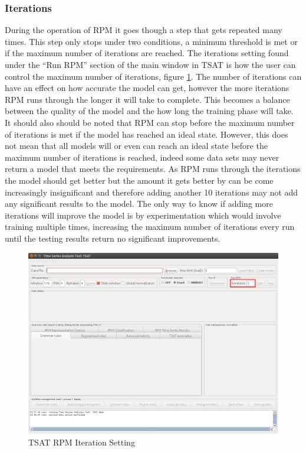 \documentclass[letterpaper, 12pt]{article}
\begin{document}
\newpage
\subsubsection{Iterations}
\label{iterations}
During the operation of RPM it goes though a step that gets repeated many times. This step only stops under two conditions, a minimum threshold is met or if the maximum number of iterations are reached. The iterations setting found under the ``Run RPM'' section of the main window in TSAT is how the user can control the maximum number of iterations, figure \ref{fig:TSAT-iteration-setting}. The number of iterations can have an effect on how accurate the model can get, however the more iterations RPM runs through the longer it will take to complete. This becomes a balance between the quality of the model and the how long the training phase will take. It should also should be noted that RPM can stop before the maximum number of iterations is met if the model has reached an ideal state. However, this does not mean that all models will or even can reach an ideal state before the maximum number of iterations is reached, indeed some data sets may never return a model that meets the requirements. As RPM runs through the iterations the model should get better but the amount it gets better by can be come increasingly insignificant and therefore adding another 10 iterations may not add any significant results to the model. The only way to know if adding more iterations will improve the model is by experimentation which would involve training multiple times, increasing the maximum number of iterations every run until the testing results return no significant improvements.

\begin{figure}[H]
	\includegraphics[width=\textwidth]{TSAT-iterations-setting}
	\caption{TSAT RPM Iteration Setting}
	\label{fig:TSAT-iteration-setting}
\end{figure}
\end{document}
